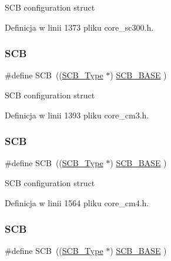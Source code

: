 S\+CB configuration struct 

Definicja w linii 1373 pliku core\+\_\+sc300.\+h.

\mbox{\label{group___c_m_s_i_s__core__base_gaaaf6477c2bde2f00f99e3c2fd1060b01}} 
\subsubsection{\texorpdfstring{S\+CB}{SCB}\hspace{0.1cm}{\footnotesize\ttfamily [8/12]}}
{\footnotesize\ttfamily \#define S\+CB~((\hyperlink{struct_s_c_b___type}{S\+C\+B\+\_\+\+Type}       $\ast$)     \hyperlink{group___c_m_s_i_s__core__base_gad55a7ddb8d4b2398b0c1cfec76c0d9fd}{S\+C\+B\+\_\+\+B\+A\+SE}      )}

S\+CB configuration struct 

Definicja w linii 1393 pliku core\+\_\+cm3.\+h.

\mbox{\label{group___c_m_s_i_s__core__base_gaaaf6477c2bde2f00f99e3c2fd1060b01}} 
\subsubsection{\texorpdfstring{S\+CB}{SCB}\hspace{0.1cm}{\footnotesize\ttfamily [9/12]}}
{\footnotesize\ttfamily \#define S\+CB~((\hyperlink{struct_s_c_b___type}{S\+C\+B\+\_\+\+Type}       $\ast$)     \hyperlink{group___c_m_s_i_s__core__base_gad55a7ddb8d4b2398b0c1cfec76c0d9fd}{S\+C\+B\+\_\+\+B\+A\+SE}      )}

S\+CB configuration struct 

Definicja w linii 1564 pliku core\+\_\+cm4.\+h.

\mbox{\label{group___c_m_s_i_s__core__base_gaaaf6477c2bde2f00f99e3c2fd1060b01}} 
\subsubsection{\texorpdfstring{S\+CB}{SCB}\hspace{0.1cm}{\footnotesize\ttfamily [10/12]}}
{\footnotesize\ttfamily \#define S\+CB~((\hyperlink{struct_s_c_b___type}{S\+C\+B\+\_\+\+Type}       $\ast$)     \hyperlink{group___c_m_s_i_s__core__base_gad55a7ddb8d4b2398b0c1cfec76c0d9fd}{S\+C\+B\+\_\+\+B\+A\+SE}      )}

